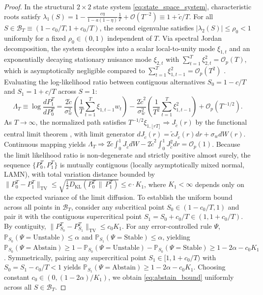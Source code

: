\documentclass[12pt]{article}
\theoremstyle{definition}
\theoremstyle{remark}
\begin{document}
\begin{proof}
In the structural $2 \times 2$ state system \eqref{eq:state_space_system}, characteristic roots satisfy $\lambda_1(S) = 1 - \frac{c \eta}{1 - a(1 - \eta)} \frac{1}{T} + \mathcal{O}(T^{-2}) \equiv 1 + \tilde{c}/T$. For all $S \in \mathcal{B}_T \equiv (1 - c_0/T, 1 + c_0/T)$, the second eigenvalue satisfies $|\lambda_2(S)| \le \rho_0 < 1$ uniformly for a fixed $\rho_0 \in (0, 1)$ independent of $T$. Via spectral Jordan decomposition, the system decouples into a scalar local-to-unity mode $\xi_{1,t}$ and an exponentially decaying stationary nuisance mode $\xi_{2,t}$ with $\sum_{t=1}^T \xi_{2,t}^2 = \mathcal{O}_p(T)$, which is asymptotically negligible compared to $\sum_{t=1}^T \xi_{1,t-1}^2 = \mathcal{O}_p(T^2)$ \citep{phillips1987time}.
Evaluating the log-likelihood ratio between contiguous alternatives $S_0 = 1 - c/T$ and $S_1 = 1 + c/T$ across $S=1$:
\begin{equation}
\Lambda_T \equiv \log \frac{dP_1^T}{dP_0^T} = \frac{2\tilde{c}}{\sigma_w^2} \left( \frac{1}{T} \sum_{t=1}^T \xi_{1, t-1} w_t \right) - \frac{2\tilde{c}^2}{\sigma_w^2} \left( \frac{1}{T^2} \sum_{t=1}^T \xi_{1, t-1}^2 \right) + \mathcal{O}_p(T^{-1/2}).
\end{equation}
As $T \to \infty$, the normalized path satisfies $T^{-1/2} \xi_{1, \lfloor rT \rfloor} \Rightarrow J_{\tilde{c}}(r)$ by the functional central limit theorem \citep{phillips1987time}, with limit generator $dJ_{\tilde{c}}(r) = \tilde{c} J_{\tilde{c}}(r) dr + \sigma_w dW(r)$. Continuous mapping yields $\Lambda_T \Rightarrow 2\tilde{c} \int_0^1 J_{\tilde{c}} dW - 2\tilde{c}^2 \int_0^1 J_{\tilde{c}}^2 dr = \mathcal{O}_p(1)$.
Because the limit likelihood ratio is non-degenerate and strictly positive almost surely, the sequence $\{P_0^T, P_1^T\}$ is mutually contiguous (locally asymptotically mixed normal, LAMN), with total variation distance bounded by $\|P_0^T - P_1^T\|_{\text{TV}} \le \sqrt{\frac{1}{2} D_{\text{KL}}(P_0^T \,\|\, P_1^T)} \le c \cdot K_1$, where $K_1 < \infty$ depends only on the expected variance of the limit diffusion.
To establish the uniform bound across all points in $\mathcal{B}_T$, consider any subcritical point $S_0 \in (1 - c_0/T, 1)$ and pair it with the contiguous supercritical point $S_1 = S_0 + c_0/T \in (1, 1 + c_0/T)$. By contiguity, $\|P_{S_0}^T - P_{S_1}^T\|_{\text{TV}} \le c_0 K_1$. For any error-controlled rule $\Psi$, $\mathbb{P}_{S_0}(\Psi = \text{Unstable}) \le \alpha$ and $\mathbb{P}_{S_1}(\Psi = \text{Stable}) \le \alpha$, yielding $\mathbb{P}_{S_0}(\Psi = \text{Abstain}) \ge 1 - \mathbb{P}_{S_0}(\Psi = \text{Unstable}) - \mathbb{P}_{S_0}(\Psi = \text{Stable}) \ge 1 - 2\alpha - c_0 K_1$. Symmetrically, pairing any supercritical point $S_1 \in [1, 1 + c_0/T)$ with $S_0 = S_1 - c_0/T < 1$ yields $\mathbb{P}_{S_1}(\Psi = \text{Abstain}) \ge 1 - 2\alpha - c_0 K_1$. Choosing constant $c_0 \in (0, (1 - 2\alpha)/K_1)$, we obtain \eqref{eq:abstain_bound} uniformly across all $S \in \mathcal{B}_T$.

\end{proof}
\end{document}
